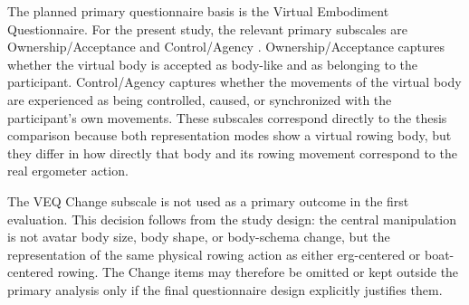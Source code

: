 The planned primary questionnaire basis is the Virtual Embodiment Questionnaire.
For the present study, the relevant primary subscales are Ownership/Acceptance and Control/Agency \parencite{rothLatoschik2020veq}.
Ownership/Acceptance captures whether the virtual body is accepted as body-like and as belonging to the participant.
Control/Agency captures whether the movements of the virtual body are experienced as being controlled, caused, or synchronized with the participant's own movements.
These subscales correspond directly to the thesis comparison because both representation modes show a virtual rowing body, but they differ in how directly that body and its rowing movement correspond to the real ergometer action.

The VEQ Change subscale is not used as a primary outcome in the first evaluation.
This decision follows from the study design: the central manipulation is not avatar body size, body shape, or body-schema change, but the representation of the same physical rowing action as either erg-centered or boat-centered rowing.
The Change items may therefore be omitted or kept outside the primary analysis only if the final questionnaire design explicitly justifies them.

